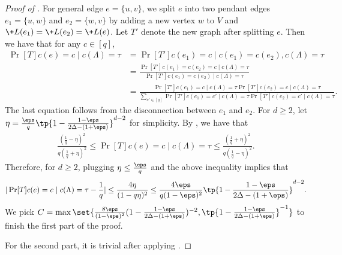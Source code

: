 \begin{proof}[Proof of ]
    For general edge $e = \{u,v\}$, we split $e$ into two pendant edges $e_1 = \{u,w\}$ and $e_2 = \{w,v\}$ by adding a new vertex $w$ to $V$ and $\+L(e_1) = \+L(e_2) = \+L(e)$.
    Let $T'$ denote the new graph after splitting $e$. 
    Then we have that for any $c\in [q]$,
    \begin{align*}
        \Pr[T]{c(e) = c\mid c(\Lambda) = \tau} &= \Pr[T']{c(e_1) = c\mid c(e_1) = c(e_2), c(\Lambda) = \tau}
        \\&=\frac{\Pr[T']{c(e_1) = c(e_2) = c\mid c(\Lambda) = \tau}}{\Pr[T']{c(e_1) = c(e_2)\mid c(\Lambda) = \tau}}
        \\&= \frac{\Pr[T']{c(e_1) = c\mid c(\Lambda) = \tau}\Pr[T']{c(e_2) = c\mid c(\Lambda) = \tau}}{\sum_{c'\in[q]}\Pr[T']{c(e_1) = c'\mid c(\Lambda) = \tau}\Pr[T']{c(e_2) = c'\mid c(\Lambda) = \tau}}.
    \end{align*}
    The last equation follows from the disconnection between $e_1$ and $e_2$.
    For $d\geq 2$, let $\eta = \frac{\eps}{q} \tp{1 - \frac{1 - \eps}{2\Delta - (1+\eps)}}^{d-2}$ for simplicity.
    By , we have that
    \begin{align*}
        \frac{(\frac 1q - \eta)^2}{q(\frac 1q + \eta)^2} \leq \Pr[T]{c(e) = c\mid c(\Lambda) = \tau} \leq \frac{(\frac 1q + \eta)^2}{q(\frac 1q - \eta)^2}.
    \end{align*}
    Therefore, for $d\geq 2$, plugging $\eta \leq \frac{\eps}{q}$ and the above inequality implies that 
    $$
        |\Pr[T]{c(e) = c\mid c(\Lambda) = \tau} - \frac 1q| \leq \frac{4\eta}{(1 - q\eta)^2}\leq \frac{4\eps}{q(1-\eps)^2} \tp{1 - \frac{1 - \eps}{2\Delta - (1+\eps)}}^{d-2}.
    $$
    We pick $C = \max\set{\frac{8\eps}{(1-\eps)^2}(1 - \frac{1 - \eps}{2\Delta - (1+\eps)})^{-2}, \tp{1 - \frac{1 - \eps}{2\Delta - (1+\eps)}}^{-1} }$ to finish the first part of the proof.

    For the second part, it is trivial after applying .
\end{proof}

